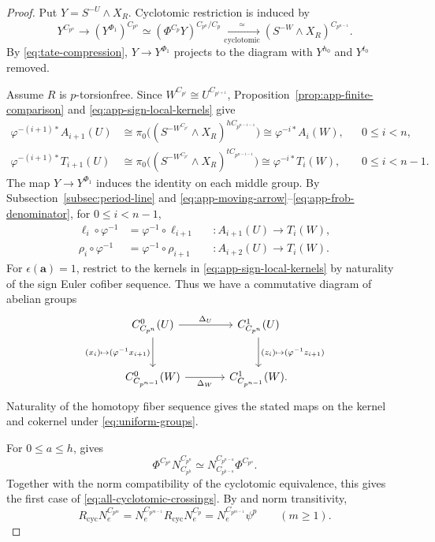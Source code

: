 \begin{proof}
Put $Y=S^{-U}\wedge X_R$.
Cyclotomic restriction is induced by
\[
Y^{C_{p^n}}
\longrightarrow
(Y^{\Phi_1})^{C_{p^n}}
\simeq (\Phi^{C_p}Y)^{C_{p^n}/C_p}
\xrightarrow[\mathrm{cyclotomic}]{\simeq}
(S^{-W}\wedge X_R)^{C_{p^{n-1}}}.
\]
By \eqref{eq:tate-compression}, $Y\to Y^{\Phi_1}$
projects to the diagram with $Y^{h_0}$ and $Y^{t_0}$ removed.

Assume $R$ is $p$-torsionfree. Since
$W^{C_{p^i}}\cong U^{C_{p^{i+1}}}$,
Proposition~\ref{prop:app-finite-comparison} and
\eqref{eq:app-sign-local-kernels} give
\[
\begin{aligned}
\varphi^{-(i+1)*}A_{i+1}(U)
&\cong
\pi_0\bigl((S^{-W^{C_{p^i}}}\wedge X_R)
^{hC_{p^{n-i-1}}}\bigr)
\cong\varphi^{-i*}A_i(W),
&&0\le i<n,\\
\varphi^{-(i+1)*}T_{i+1}(U)
&\cong
\pi_0\bigl((S^{-W^{C_{p^i}}}\wedge X_R)
^{tC_{p^{n-i-1}}}\bigr)
\cong\varphi^{-i*}T_i(W),
&&0\le i<n-1.
\end{aligned}
\]
The map $Y\to Y^{\Phi_1}$ induces the identity on each middle group.
By Subsection~\ref{subsec:period-line} and
\eqref{eq:app-moving-arrow}--\eqref{eq:app-frob-denominator},
for $0\le i<n-1$,
\[
\begin{aligned}
\ell_i\circ\varphi^{-1}
 &=\varphi^{-1}\circ\ell_{i+1}
 &&:A_{i+1}(U)\longrightarrow T_i(W),\\
\rho_i\circ\varphi^{-1}
 &=\varphi^{-1}\circ\rho_{i+1}
 &&:A_{i+2}(U)\longrightarrow T_i(W).
\end{aligned}
\]
For $\epsilon(\mathbf a)=1$, restrict to the kernels in
\eqref{eq:app-sign-local-kernels} by naturality of the
sign Euler cofiber sequence.
Thus we have a commutative diagram of abelian groups
\[
\begin{tikzcd}[column sep=large,row sep=large]
C_{C_{p^n}}^0(U)
  \arrow[r,"\Delta_U"]
  \arrow[d,"{(x_i)\mapsto(\varphi^{-1}x_{i+1})}"']
& C_{C_{p^n}}^1(U)
  \arrow[d,"{(z_i)\mapsto(\varphi^{-1}z_{i+1})}"] \\
C_{C_{p^{n-1}}}^0(W)
  \arrow[r,"\Delta_W"']
& C_{C_{p^{n-1}}}^1(W).
\end{tikzcd}
\]
Naturality of the homotopy fiber sequence gives the stated
maps on the kernel and cokernel under \eqref{eq:uniform-groups}.

For $0\le a\le h$, \cite[Theorem~2.35]{NormTHH} gives
\[
\Phi^{C_{p^a}}N_{C_{p^h}}^{C_{p^n}}
\simeq
N_{C_{p^{h-a}}}^{C_{p^{n-a}}}\Phi^{C_{p^a}}.
\]
Together with the norm compatibility of the cyclotomic equivalence,
this gives the first case of \eqref{eq:all-cyclotomic-crossings}.
By \cite[Remark~5.2]{SulymaNew} and norm transitivity,
\[
R_{\mathrm{cyc}}N_e^{C_{p^m}}
=
N_e^{C_{p^{m-1}}}R_{\mathrm{cyc}}N_e^{C_p}
=
N_e^{C_{p^{m-1}}}\psi^p
\qquad(m\ge1).
\]
\end{proof}
